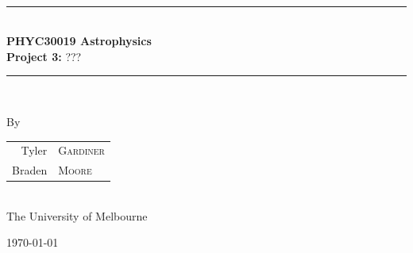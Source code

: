 \documentclass[a4paper]{article} %
\begin{document}
\pagestyle{empty}

\newcommand{\HRule}{\rule{\linewidth}{0.5mm}}

\begin{titlepage}

    \begin{center}
        \textsc{}\\[3cm]

        \HRule \\[0.5cm]
        \Huge \textbf{PHYC30019 Astrophysics}\\[0.5cm]
        \huge \textbf{Project 3:} ???\\[0.5cm] 
        \HRule \\[1.5cm]

        \begin{minipage}{0.5\textwidth}
        \begin{center}

		\vspace{3cm}
        \large By \\[0.75cm]
        \begin{tabular}{rl}
        \Large Tyler & \Large \textsc{Gardiner} \\ [0.1cm]
        \Large Braden &\Large \textsc{Moore} \\
		\end{tabular}  
		\\[1cm]
        \normalsize \normalfont 
        The University of Melbourne \\[2cm]

        \end{center}
        \end{minipage}

        \vfill

        \large \today
    \end{center}

\newpage
\end{titlepage}

\pagestyle{fancy}
\setcounter{page}{1}
\end{document}
